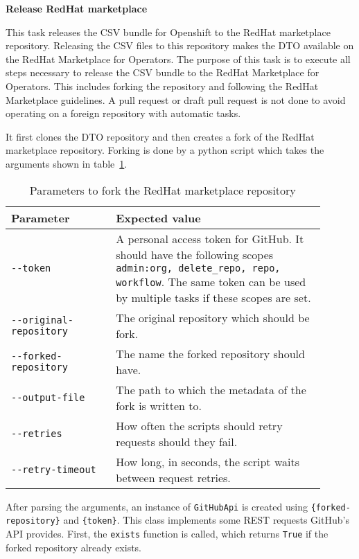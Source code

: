 \textbf{Release RedHat marketplace}

This task releases the CSV bundle for Openshift to the RedHat marketplace repository.
Releasing the CSV files to this repository makes the DTO available on the RedHat Marketplace for Operators.
The purpose of this task is to execute all steps necessary to release the CSV bundle to the RedHat Marketplace for Operators.
This includes forking the repository and following the RedHat Marketplace guidelines.
A pull request or draft pull request is not done to avoid operating on a foreign repository with automatic tasks.

It first clones the DTO repository and then creates a fork of the RedHat marketplace repository.
Forking is done by a python script which takes the arguments shown in table~\ref{tab:parameters-to-fork-the-redhat-marketplace-repository}.

\begin{table}[H]
    \centering
    \caption{Parameters to fork the RedHat marketplace repository}
    \label{tab:parameters-to-fork-the-redhat-marketplace-repository}
    \begin{tabular}{p{0.3\linewidth}|p{0.6\linewidth}}
        Parameter & Expected value \\
        \hline
        \verb|--token| & A personal access token for GitHub.
            It should have the following scopes \verb|admin:org, delete_repo, repo, workflow|.
            The same token can be used by multiple tasks if these scopes are set. \\
        \verb|--original-repository| & The original repository which should be fork. \\
        \verb|--forked-repository| & The name the forked repository should have. \\
        \verb|--output-file| & The path to which the metadata of the fork is written to. \\
        \verb|--retries| & How often the scripts should retry requests should they fail. \\
        \verb|--retry-timeout| & How long, in seconds, the script waits between request retries. \\
    \end{tabular}
\end{table}

After parsing the arguments, an instance of \verb|GitHubApi| is created using \verb|{forked-repository}| and \verb|{token}|.
This class implements some REST requests GitHub's API provides.
First, the \verb|exists| function is called, which returns \verb|True| if the forked repository already exists.

